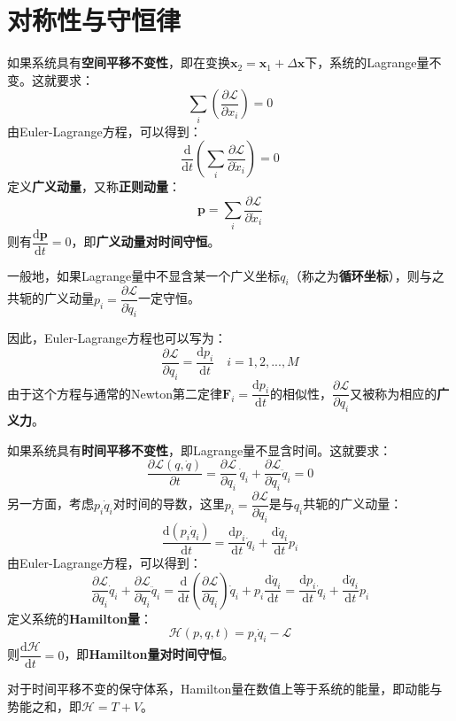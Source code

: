 \documentclass[a4paper,openany]{book}
\begin{document}
\chapter*{对称性与守恒律}

如果系统具有\textbf{空间平移不变性}，即在变换$\bm{x}_2 = \bm{x}_1 + \Delta\bm{x}$下，系统的Lagrange量不变。这就要求：
\[
    \sum_i \left(\frac{\partial \mathcal{L}}{\partial x_i}\right) = 0
\]
由Euler-Lagrange方程，可以得到：
\[
    \frac{\mathrm{d}}{\mathrm{d}t}\left(\sum_i\frac{\partial \mathcal{L}}{\partial \dot{x}_i}\right) = 0
\]
定义\textbf{广义动量}，又称\textbf{正则动量}：
\[
    \boxed{\bm{p} = \sum_i\frac{\partial \mathcal{L}}{\partial \dot{x}_i}}
\]
则有$\dfrac{\mathrm{d}\bm{p}}{\mathrm{d}t} = 0$，即\textbf{广义动量对时间守恒}。

一般地，如果Lagrange量中不显含某一个广义坐标$q_i$（称之为\textbf{循环坐标}），则与之共轭的广义动量$p_i = \dfrac{\partial \mathcal{L}}{\partial \dot{q}_i}$一定守恒。

因此，Euler-Lagrange方程也可以写为：
\[
    \frac{\partial \mathcal{L}}{\partial q_i} = \frac{\mathrm{d}p_i}{\mathrm{d}t}\quad i=1,2,...,M
\]
由于这个方程与通常的Newton第二定律$\bm{F}_i = \dfrac{\mathrm{d}p_i}{\mathrm{d}t}$的相似性，$\dfrac{\partial \mathcal{L}}{\partial q_i}$又被称为相应的\textbf{广义力}。

如果系统具有\textbf{时间平移不变性}，即Lagrange量不显含时间。这就要求：
\[
    \frac{\partial \mathcal{L}(q,\dot{q})}{\partial t} = \frac{\partial \mathcal{L}}{\partial q_i}\,\dot{q}_i + \frac{\partial \mathcal{L}}{\partial \dot{q}_i}\ddot{q}_i = 0
\]
另一方面，考虑$p_i\dot{q}_i$对时间的导数，这里$p_i = \dfrac{\partial \mathcal{L}}{\partial \dot{q}_i}$是与$q_i$共轭的广义动量：
\[
    \frac{\mathrm{d}(p_i\dot{q}_i)}{\mathrm{d}t} = \frac{\mathrm{d}p_i}{\mathrm{d}t}\dot{q}_i + \frac{\mathrm{d}\dot{q}_i}{\mathrm{d}t}p_i
\]
由Euler-Lagrange方程，可以得到：
\[
    \frac{\partial \mathcal{L}}{\partial q_i}\dot{q}_i + \frac{\partial \mathcal{L}}{\partial \dot{q}_i}\ddot{q}_i
= \frac{\mathrm{d}}{\mathrm{d}t}\left(\frac{\partial \mathcal{L}}{\partial \dot{q}_i}\right)\dot{q}_i + p_i\frac{\mathrm{d}\dot{q}_i}{\mathrm{d}t}
= \frac{\mathrm{d}p_i}{\mathrm{d}t}\dot{q}_i + \frac{\mathrm{d}\dot{q}_i}{\mathrm{d}t}p_i
\]
定义系统的\textbf{Hamilton量}：
\[
    \boxed{\mathcal{H}(p,q,t) = p_i \dot{q}_i - \mathcal{L}}
\]
则$\dfrac{\mathrm{d}\mathcal{H}}{\mathrm{d}t} = 0$，即\textbf{Hamilton量对时间守恒}。

对于时间平移不变的保守体系，Hamilton量在数值上等于系统的能量，即动能与势能之和，即$\boxed{\mathcal{H} = T + V}$。
\end{document}
